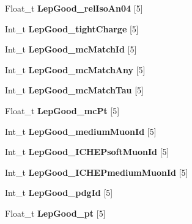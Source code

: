 \begin{DoxyCompactItemize}
\item 
\hypertarget{classMiniTree_ab8b1cd889e69489522f69364e17630fc}{}\label{classMiniTree_ab8b1cd889e69489522f69364e17630fc} 
Float\+\_\+t {\bfseries Lep\+Good\+\_\+rel\+Iso\+An04} \mbox{[}5\mbox{]}
\item 
\hypertarget{classMiniTree_abb039b81ed6f85fb7239f145cb189063}{}\label{classMiniTree_abb039b81ed6f85fb7239f145cb189063} 
Int\+\_\+t {\bfseries Lep\+Good\+\_\+tight\+Charge} \mbox{[}5\mbox{]}
\item 
\hypertarget{classMiniTree_acc304a3320fc0848a7d65b6d6a070fcf}{}\label{classMiniTree_acc304a3320fc0848a7d65b6d6a070fcf} 
Int\+\_\+t {\bfseries Lep\+Good\+\_\+mc\+Match\+Id} \mbox{[}5\mbox{]}
\item 
\hypertarget{classMiniTree_abdc8e98f50d011ab70e47f5227cd4f7e}{}\label{classMiniTree_abdc8e98f50d011ab70e47f5227cd4f7e} 
Int\+\_\+t {\bfseries Lep\+Good\+\_\+mc\+Match\+Any} \mbox{[}5\mbox{]}
\item 
\hypertarget{classMiniTree_a0d86508b0650636db0a6646e349b7f12}{}\label{classMiniTree_a0d86508b0650636db0a6646e349b7f12} 
Int\+\_\+t {\bfseries Lep\+Good\+\_\+mc\+Match\+Tau} \mbox{[}5\mbox{]}
\item 
\hypertarget{classMiniTree_a0425df4932ad18c79fcb220b0b4dcca4}{}\label{classMiniTree_a0425df4932ad18c79fcb220b0b4dcca4} 
Float\+\_\+t {\bfseries Lep\+Good\+\_\+mc\+Pt} \mbox{[}5\mbox{]}
\item 
\hypertarget{classMiniTree_ad5b24c8afbc77ac1eaa386076a60e77e}{}\label{classMiniTree_ad5b24c8afbc77ac1eaa386076a60e77e} 
Int\+\_\+t {\bfseries Lep\+Good\+\_\+medium\+Muon\+Id} \mbox{[}5\mbox{]}
\item 
\hypertarget{classMiniTree_a827c2400a407f42445f7f5944006c618}{}\label{classMiniTree_a827c2400a407f42445f7f5944006c618} 
Int\+\_\+t {\bfseries Lep\+Good\+\_\+\+I\+C\+H\+E\+Psoft\+Muon\+Id} \mbox{[}5\mbox{]}
\item 
\hypertarget{classMiniTree_aeced1e074d5154a4207652235d64f9fd}{}\label{classMiniTree_aeced1e074d5154a4207652235d64f9fd} 
Int\+\_\+t {\bfseries Lep\+Good\+\_\+\+I\+C\+H\+E\+Pmedium\+Muon\+Id} \mbox{[}5\mbox{]}
\item 
\hypertarget{classMiniTree_acd4d1bc3f126174a28f83770e0f00b06}{}\label{classMiniTree_acd4d1bc3f126174a28f83770e0f00b06} 
Int\+\_\+t {\bfseries Lep\+Good\+\_\+pdg\+Id} \mbox{[}5\mbox{]}
\item 
\hypertarget{classMiniTree_a4a7a2991c55dac1bc7180af6f50cd6c2}{}\label{classMiniTree_a4a7a2991c55dac1bc7180af6f50cd6c2} 
Float\+\_\+t {\bfseries Lep\+Good\+\_\+pt} \mbox{[}5\mbox{]}

\end{DoxyCompactItemize}
